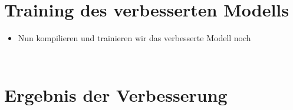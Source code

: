 \documentclass[t]{beamer}
\newcommand\pycode[1]{\inputminted[frame=lines, framesep=2mm, fontsize=\normalsize]{python}{#1}}
\begin{document}
\section{Training des verbesserten Modells}
\begin{frame}
    \begin{itemize}
        \item Nun kompilieren und trainieren wir das verbesserte Modell noch
        \pycode{./code-snippets/model-compile.py}
        \pycode{./code-snippets/improved-model-fit.py}
    \end{itemize}
\end{frame}

\section{Ergebnis der Verbesserung}
\end{document}
